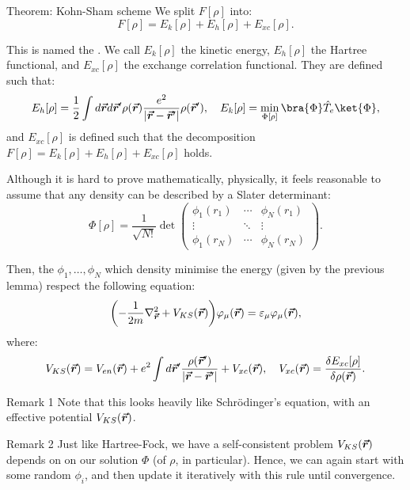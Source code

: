 \documentclass[a4paper]{article}
\begin{document}
\begin{parag}{Theorem: Kohn-Sham scheme}
    We split $F\left[\rho\right]$ into: 
    \[F\left[\rho\right] = E_k\left[\rho\right] + E_h\left[\rho\right] + E_{xc}\left[\rho\right].\]

    This is named the . We call $E_k\left[\rho\right]$ the kinetic energy, $E_h\left[\rho\right]$ the Hartree functional, and $E_{xc}\left[\rho\right]$ the exchange correlation functional. They are defined such that: 
    \[E_h\left[\rho\right] = \frac{1}{2} \int d \bvec{r} d \bvec{r}' \rho\left(\bvec{r}\right) \frac{e^2}{\left|\bvec{r} - \bvec{r}'\right|} \rho\left(\bvec{r}'\right), \mathspace E_k\left[\rho\right] = \min_{\Phi\left[\rho\right]} \bra{\Phi} \hat{T}_e \ket{\Phi},\]
    and $E_{xc}\left[\rho\right]$ is defined such that the decomposition $F\left[\rho\right] = E_k\left[\rho\right] + E_h\left[\rho\right] + E_{xc}\left[\rho\right]$ holds.

    Although it is hard to prove mathematically, physically, it feels reasonable to assume that any density can be described by a Slater determinant:
    \[\Phi\left[\rho\right] = \frac{1}{\sqrt{N!}} \det\begin{pmatrix} \phi_1\left(r_1\right) & \cdots & \phi_N\left(r_1\right) \\ \vdots & \ddots & \vdots \\ \phi_1\left(r_N\right) & \cdots & \phi_N\left(r_N\right) \end{pmatrix}.\]

    Then, the $\phi_1, \ldots, \phi_N$ which density minimise the energy (given by the previous lemma) respect the following equation:
    \[\left(-\frac{1}{2m} \nabla^2_{\bvec{r}} + V_{KS}\left(\bvec{r}\right)\right) \phi_{\mu}\left(\bvec{r}\right) = \epsilon_{\mu} \phi_{\mu}\left(\bvec{r}\right),\]
    where:
    \[V_{KS}\left(\bvec{r}\right) = V_{en}\left(\bvec{r}\right) + e^2 \int d \bvec{r}' \frac{\rho\left(\bvec{r}'\right)}{\left|\bvec{r} - \bvec{r}'\right|} + V_{xc}\left(\bvec{r}\right), \mathspace V_{xc}\left(\bvec{r}\right) = \frac{\delta E_{xc}\left[\rho\right]}{\delta \rho\left(\bvec{r}\right)}.\]

    \begin{subparag}{Remark 1}
        Note that this looks heavily like Schrödinger's equation, with an effective potential $V_{KS}\left(\bvec{r}\right)$.
    \end{subparag}

    \begin{subparag}{Remark 2}
      Just like Hartree-Fock, we have a self-consistent problem $V_{KS}\left(\bvec{r}\right)$ depends on on our solution $\Phi$ (of $\rho$, in particular). Hence, we can again start with some random $\phi_i$, and then update it iteratively with this rule until convergence.
    \end{subparag}


\end{parag}
\end{document}

